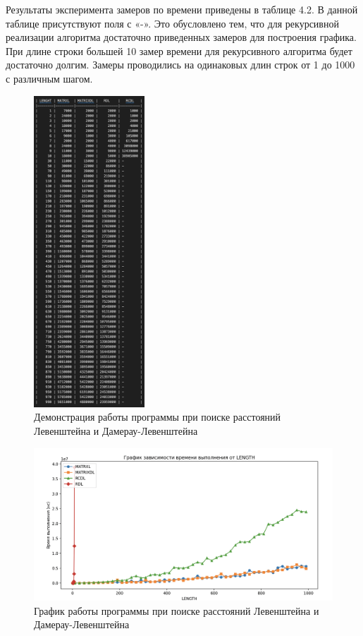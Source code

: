 Результаты эксперимента замеров по времени приведены в таблице 4.2. В данной
таблице присутствуют поля с «-». Это обусловлено тем, что для 
рекурсивной реализации алгоритма достаточно приведенных замеров для 
построения графика. При длине строки большей 10 замер времени для рекурсивного
алгоритма будет достаточно долгим.
Замеры проводились на одинаковых длин строк от 1 до 1000 с различным шагом.

\begin{figure}[h]
	\centering
	\includegraphics[width=0.37\textwidth]{img/resultTime.jpg}
	\caption{Демонстрация работы программы при поиске расстояний Левенштейна и Дамерау-Левенштейна}
	\label{img:demonstration}
\end{figure}

\begin{figure}[h]
	\centering
	\includegraphics[width=1\textwidth]{img/graphic_2.jpg}
	\caption{График работы программы при поиске расстояний Левенштейна и Дамерау-Левенштейна}
	\label{img:demonstration}
\end{figure}

